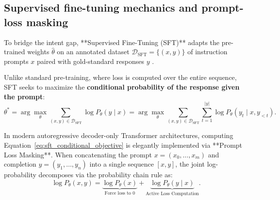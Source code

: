\documentclass[../../main.tex]{subfiles}
\begin{document}
\subsection{Supervised fine-tuning mechanics and prompt-loss masking}
\label{subsec:sft_mechanics_loss_masking}

To bridge the intent gap, **Supervised Fine-Tuning (SFT)** adapts the pre-trained weights $\hat{\theta}$ on an annotated dataset $\mathcal{D}_{\text{SFT}} = \{(x, y)\}$ of instruction prompts $x$ paired with gold-standard responses $y$ \citep{xiao2025}. 

Unlike standard pre-training, where loss is computed over the entire sequence, SFT seeks to maximize the \textbf{conditional probability of the response given the prompt}:
\begin{equation}
\label{eq:sft_conditional_objective}
\theta^* = \arg\max_\theta \sum_{(x, y) \in \mathcal{D}_{\text{SFT}}} \log P_\theta(y \mid x) = \arg\max_\theta \sum_{(x, y) \in \mathcal{D}_{\text{SFT}}} \sum_{t=1}^{|y|} \log P_\theta(y_t \mid x, y_{<t}).
\end{equation}

In modern autoregressive decoder-only Transformer architectures, computing Equation~\eqref{eq:sft_conditional_objective} is elegantly implemented via **Prompt Loss Masking**. When concatenating the prompt $x = (x_0, \dots, x_m)$ and completion $y = (y_1, \dots, y_n)$ into a single sequence $[x, y]$, the joint log-probability decomposes via the probability chain rule as:
\begin{equation}
\log P_\theta(x, y) = \underbrace{\log P_\theta(x)}_{\text{Force loss to } 0} + \underbrace{\log P_\theta(y \mid x)}_{\text{Active Loss Computation}}.
\end{equation}
\end{document}
